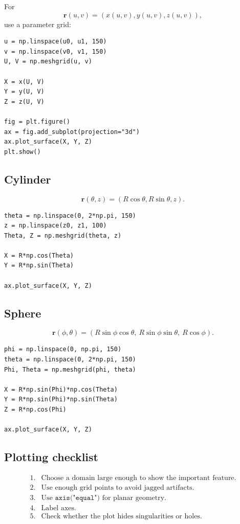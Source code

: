 For
\[
    \mathbf r(u,v)=(x(u,v),y(u,v),z(u,v)),
\]
use a parameter grid:

\begin{verbatim}
u = np.linspace(u0, u1, 150)
v = np.linspace(v0, v1, 150)
U, V = np.meshgrid(u, v)

X = x(U, V)
Y = y(U, V)
Z = z(U, V)

fig = plt.figure()
ax = fig.add_subplot(projection="3d")
ax.plot_surface(X, Y, Z)
plt.show()
\end{verbatim}

\subsection*{Cylinder}

\[
    \mathbf r(\theta,z)=(R\cos\theta,R\sin\theta,z).
\]

\begin{verbatim}
theta = np.linspace(0, 2*np.pi, 150)
z = np.linspace(z0, z1, 100)
Theta, Z = np.meshgrid(theta, z)

X = R*np.cos(Theta)
Y = R*np.sin(Theta)

ax.plot_surface(X, Y, Z)
\end{verbatim}

\subsection*{Sphere}

\[
    \mathbf r(\phi,\theta)
    =
    (R\sin\phi\cos\theta,\ R\sin\phi\sin\theta,\ R\cos\phi).
\]

\begin{verbatim}
phi = np.linspace(0, np.pi, 150)
theta = np.linspace(0, 2*np.pi, 150)
Phi, Theta = np.meshgrid(phi, theta)

X = R*np.sin(Phi)*np.cos(Theta)
Y = R*np.sin(Phi)*np.sin(Theta)
Z = R*np.cos(Phi)

ax.plot_surface(X, Y, Z)
\end{verbatim}

\subsection*{Plotting checklist}

\[
\begin{array}{ll}
1. & \text{Choose a domain large enough to show the important feature.}\\[1mm]
2. & \text{Use enough grid points to avoid jagged artifacts.}\\[1mm]
3. & \text{Use }\texttt{axis("equal")}\text{ for planar geometry.}\\[1mm]
4. & \text{Label axes.}\\[1mm]
5. & \text{Check whether the plot hides singularities or holes.}
\end{array}
\]

